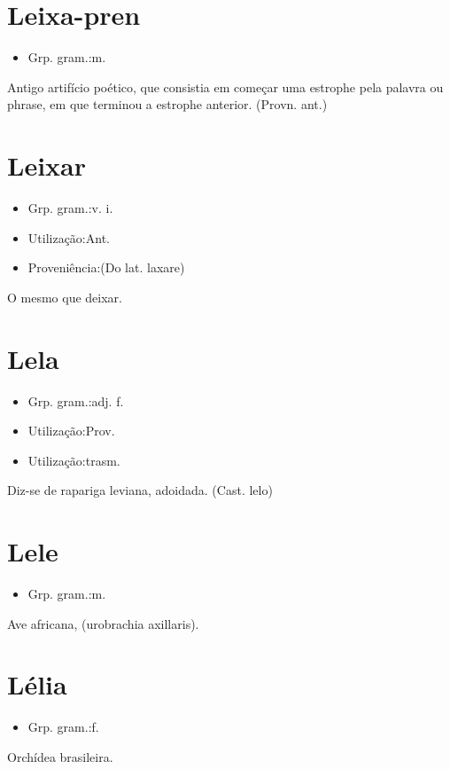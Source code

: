 \section{Leixa-pren}
\begin{itemize}
\item {Grp. gram.:m.}
\end{itemize}
Antigo artifício poético, que consistia em começar uma estrophe pela palavra ou phrase, em que terminou a estrophe anterior.
(Provn. ant.)
\section{Leixar}
\begin{itemize}
\item {Grp. gram.:v. i.}
\end{itemize}
\begin{itemize}
\item {Utilização:Ant.}
\end{itemize}
\begin{itemize}
\item {Proveniência:(Do lat. \textunderscore laxare\textunderscore )}
\end{itemize}
O mesmo que \textunderscore deixar\textunderscore .
\section{Lela}
\begin{itemize}
\item {Grp. gram.:adj. f.}
\end{itemize}
\begin{itemize}
\item {Utilização:Prov.}
\end{itemize}
\begin{itemize}
\item {Utilização:trasm.}
\end{itemize}
Diz-se de rapariga leviana, adoidada.
(Cast. \textunderscore lelo\textunderscore )
\section{Lele}
\begin{itemize}
\item {Grp. gram.:m.}
\end{itemize}
Ave africana, (\textunderscore urobrachia axillaris\textunderscore ).
\section{Lélia}
\begin{itemize}
\item {Grp. gram.:f.}
\end{itemize}
Orchídea brasileira.
